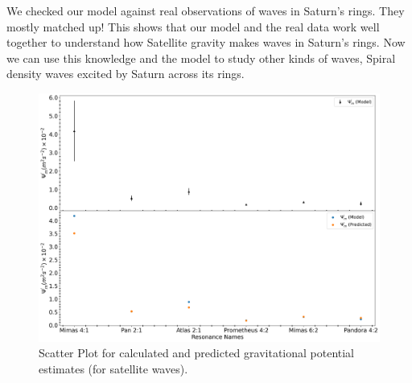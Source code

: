 \documentclass{article}
\begin{document}
We checked our model against real observations of waves in Saturn's rings. They mostly matched up! This shows that our model and the real data work well together to understand how Satellite gravity makes waves in Saturn's rings. Now we can use this knowledge and the model to study other kinds of waves, Spiral density waves excited by Saturn across its rings.

\begin{table}
\centering
{}
\caption{Estimates of Gravitational potential from theoretical model for spiral density waves excited by Saturn's Satellite resonances.}
\end{table}


\begin{figure}
    \centering
    \includegraphics[width=0.8\linewidth]{calculated_and_predicted_satellite_potential.png}
    \caption{Scatter Plot for calculated and predicted gravitational potential estimates (for satellite waves).}
    \label{fig:enter-label}
\end{figure}
\end{document}
